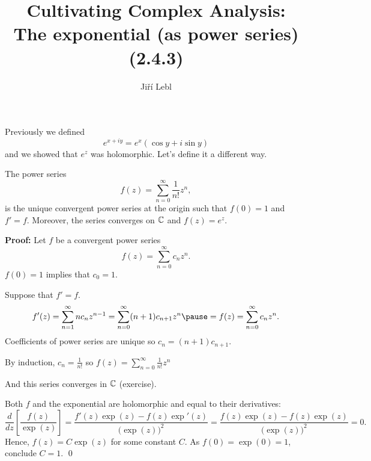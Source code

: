 \documentclass[10pt,aspectratio=169]{beamer}
\author{Ji\v{r}\'i Lebl}
\institute[OSU]{%
Departemento pri Matematiko de Oklahoma {\^S}tata Universitato}
\title{Cultivating Complex Analysis:\\%
The exponential (as power series) (2.4.3)}
\date{}
\begin{document}
\begin{frame}
\titlepage
\end{frame}

\begin{frame}
Previously we defined
\[
e^{x+iy}
= e^x (\cos y + i \sin y)
\]
and we showed that $e^z$ was holomorphic. \pause Let's define it a different
way.

\medskip
\pause

\begin{proposition}
The power series
\begin{equation*}
f(z) = \sum_{n=0}^\infty \frac{1}{n!} z^n ,
\end{equation*}
is the unique convergent power series at the origin
such that $f(0)=1$ and $f'=f$.
Moreover, the series converges on ${\mathbb{C}}$ and
$f(z) = e^z$.
\end{proposition}

\pause

\textbf{Proof:}
Let $f$ be a convergent power series
\[
f(z) = \sum_{n=0}^\infty c_n z^n .
\]
\pause
$f(0)=1$ implies that $c_0 = 1$.

\end{frame}

\begin{frame}
Suppose that $f' = f$.  \pause
\[
f'(z) =
\sum_{n=1}^\infty n c_n z^{n-1} =
\sum_{n=0}^\infty (n+1) c_{n+1} z^{n} 
\pause
=
f(z) = \sum_{n=0}^\infty c_n z^n .
\]
\pause
Coefficients of power series are unique  so $c_n = (n+1) c_{n+1}$.

\pause
By induction, $c_n = \frac{1}{n!}$ so
\(\displaystyle f(z) = \sum_{n=0}^\infty \frac{1}{n!} z^n \)

\pause
And this series converges in ${\mathbb{C}}$ (exercise).

\pause
\medskip

Both $f$ and the exponential are holomorphic and equal to their derivatives:
\pause
\[
\frac{d}{dz} \left[ \frac{f(z)}{\exp(z)} \right]
=
\frac{f'(z)\exp(z) - f(z) \exp'(z)}{{\bigl(\exp(z)\bigr)}^2}
=
\frac{f(z)\exp(z) - f(z) \exp(z)}{{\bigl(\exp(z)\bigr)}^2}
= 0.
\]
\pause
Hence, $f(z) = C \exp(z)$ for some constant $C$.
\pause
As $f(0) = \exp(0) = 1$, conclude $C=1$.
\qed
\end{frame}
\end{document}
